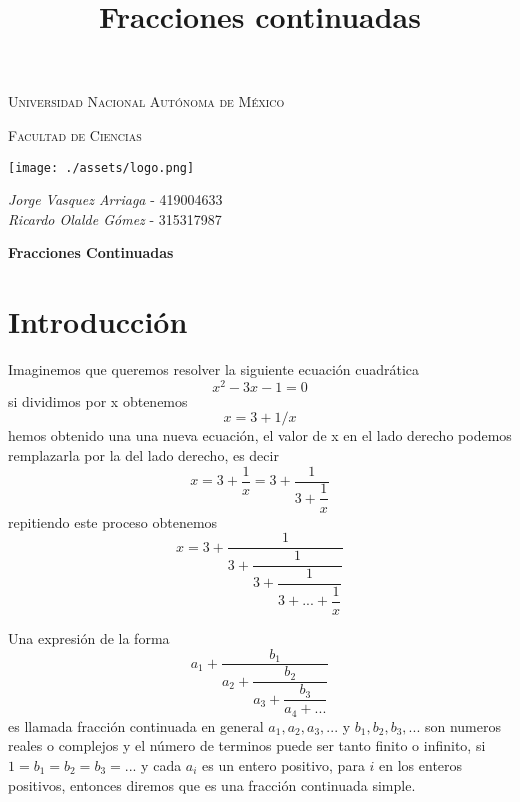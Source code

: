 \documentclass[11pt, article]{article}
\title{Fracciones continuadas}
\author{}
\date{}
\begin{document}
    \begin{center}
    {\scshape\LARGE Universidad Nacional Autónoma de México \par}

    \vspace{1cm}
    {\scshape\Large Facultad de Ciencias\par}
    \vspace{1.5cm}

    \begin{center}
        \texttt{[image: ./assets/logo.png]}
    \end{center}

    
    \vspace{0.5cm}
    \large{\itshape{Jorge Vasquez Arriaga}} \small{ - 419004633} \\ \vspace{0.3cm}
    \large{\itshape{Ricardo Olalde Gómez}} \small{ - 315317987} \\ \vspace{0.3cm}
    
    \vspace{.8 cm}

    {\LARGE \textbf{Fracciones Continuadas} \par}
    \end{center}


\section*{Introducción}
    Imaginemos que queremos resolver la siguiente ecuación cuadrática 
        \[
        x^2 -3x-1=0
        \]
    si dividimos por x obtenemos 
        \[
        x = 3 + 1/x
        \]
    hemos obtenido una una nueva ecuación, el valor de x en el lado derecho podemos remplazarla por la del lado derecho, es decir 
    \[
    x=3+\dfrac{1}{x}=3+\dfrac{1}{3+\dfrac{1}{x}}
    \]
    repitiendo este proceso obtenemos
    \[
    x=3+\dfrac{1}{3 + \dfrac{1}{3 + \dfrac{1}{3 + ... + \dfrac{1}{x}}}}
    \]
    
    Una expresión de la forma 
    \[
    a_1 + \dfrac{b_1}{a_2+ \dfrac{b_2}{a_3+\dfrac{b_3}{a_4+...}}} 
    \]
    es llamada fracción continuada en general $a_1,a_2,a_3,...$ y $b_1,b_2,b_3,...$ son numeros reales o complejos y el número de terminos puede ser tanto finito o infinito, si $1=b_1=b_2=b_3=...$ y cada $a_i$ es un entero positivo, para $i$ en los enteros positivos, entonces diremos que es una fracción continuada simple.
    
\end{document}
